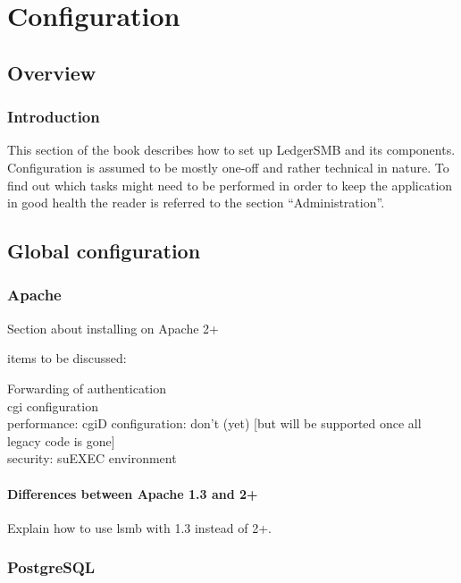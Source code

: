 

\part{Configuration}
\label{part:Configuration}


\chapter{Overview}

\section{Introduction}
This section of the book describes how to set up LedgerSMB and its components.
Configuration is assumed to be mostly one-off and rather technical in nature.  To find
out which tasks might need to be performed in order to keep the application in good
health the reader is referred to the section ``Administration''. 

\chapter{Global configuration}

\section{Apache}

Section about installing on Apache 2+

items to be discussed:

Forwarding of authentication \\
cgi configuration \\
performance: cgiD configuration: don't (yet) [but will be supported once all legacy code is gone] \\
security: suEXEC environment \\

\subsection{Differences between Apache 1.3 and 2+}

Explain how to use lsmb with 1.3 instead of 2+.

\section{PostgreSQL}

